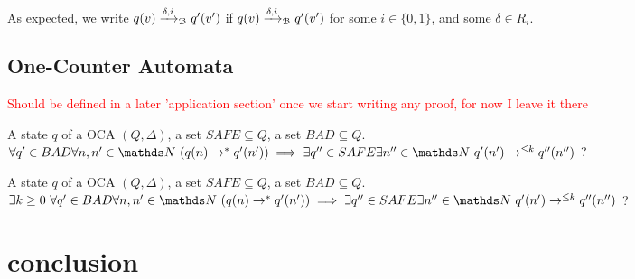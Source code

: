 As expected, we write $q(v)\xrightarrow{\delta,i}_{\mathcal{B}}q'(v')$ if 
$q(v)\xrightarrow{\delta,i}_{\mathcal{B}}q'(v')$ for some 
$i\in\{0,1\}$, and some $\delta \in R_i$.




\subsection{One-Counter Automata}

\textcolor{red}{Should be defined in a later 'application section' once we start writing any proof, for now I leave it there} 


{A state $q$ of a OCA $(Q, \Delta)$, a set $SAFE \subseteq Q$, a set $BAD \subseteq Q$.}
{$\forall q' \in BAD \forall n,n' \in \N ~ (q(n) \rightarrow^* q'(n')) \implies \exists q'' \in SAFE \exists n'' \in \N ~ q'(n') \rightarrow^{\leq k} q''(n'')$ ?\newline}



{A state $q$ of a OCA $(Q, \Delta)$, a set $SAFE \subseteq Q$, a set $BAD \subseteq Q$.}
{$\exists k \geq 0 ~ \forall q' \in BAD \forall n,n' \in \N ~ (q(n) \rightarrow^* q'(n')) \implies \exists q'' \in SAFE \exists n'' \in \N ~ q'(n') \rightarrow^{\leq k} q''(n'')$ ?\newline}

%
\fi
%

\section{conclusion}


%


%
%
%
%



